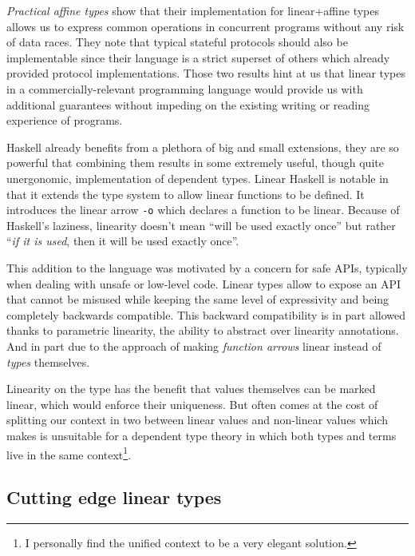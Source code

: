 \documentclass[
]{article}
\begin{document}
\emph{Practical affine types} show that their implementation for
linear+affine types allows us to express common operations in concurrent
programs without any risk of data races\cite{linear_race}. They note
that typical stateful protocols should also be implementable since their
language is a strict superset of others which already provided protocol
implementations. Those two results hint at us that linear types in a
commercially-relevant programming language would provide us with
additional guarantees without impeding on the existing writing or
reading experience of programs.

Haskell already benefits from a plethora of big and small extensions,
they are so powerful that combining them results in some extremely
useful, though quite unergonomic, implementation of dependent
types\cite{hasochism}. Linear Haskell\cite{linear_haskell} is notable in
that it extends the type system to allow linear functions to be defined.
It introduces the linear arrow \texttt{-o} which declares a function to
be linear. Because of Haskell's laziness, linearity doesn't mean ``will
be used exactly once'' but rather ``\emph{if it is used}, then it will
be used exactly once''.

This addition to the language was motivated by a concern for safe APIs,
typically when dealing with unsafe or low-level code. Linear types allow
to expose an API that cannot be misused while keeping the same level of
expressivity and being completely backwards compatible. This backward
compatibility is in part allowed thanks to parametric linearity, the
ability to abstract over linearity annotations. And in part due to the
approach of making \emph{function arrows} linear instead of \emph{types}
themselves.

Linearity on the type has the benefit that values themselves can be
marked linear, which would enforce their uniqueness. But often comes at
the cost of splitting our context in two\cite{lightweight_linear_types}
between linear values and non-linear values which makes is unsuitable
for a dependent type theory in which both types and terms live in the
same context\footnote{I personally find the unified context to be a very
  elegant solution.}.

\hypertarget{cutting-edge-linear-types}{%
\subsection{Cutting edge linear types}\label{cutting-edge-linear-types}}
\end{document}
